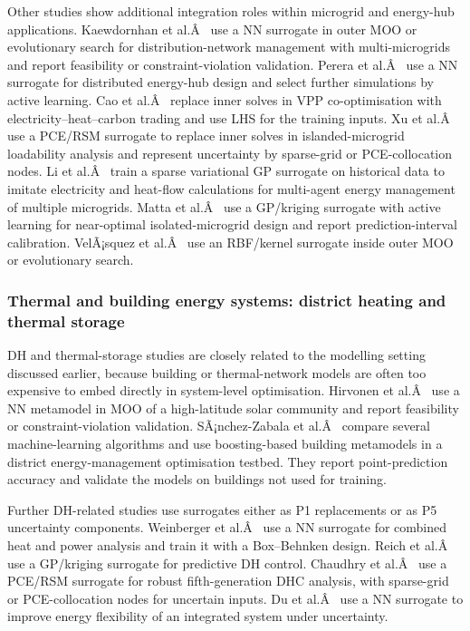 Other studies show additional integration roles within microgrid and
energy-hub applications. Kaewdornhan et al.Â~\cite{Kaewdornhan2022130373} use
a NN surrogate in outer MOO or evolutionary search for
distribution-network management with multi-microgrids and report
feasibility or constraint-violation validation. Perera et
al.Â~\cite{Perera2017187} use a NN surrogate for distributed energy-hub
design and select further simulations by active learning. Cao et
al.Â~\cite{Cao2023__2} replace inner solves in VPP co-optimisation with
electricity--heat--carbon trading and use LHS for the training inputs.
Xu et al.Â~\cite{Xu20184696} use a PCE/RSM surrogate to replace inner solves
in islanded-microgrid loadability analysis and represent uncertainty by
sparse-grid or PCE-collocation nodes. Li et al.Â~\cite{Li2023__3} train a
sparse variational GP surrogate on historical data to imitate
electricity and heat-flow calculations for multi-agent energy
management of multiple microgrids. Matta et
al.Â~\cite{Matta2026} use a GP/kriging surrogate with active learning for
near-optimal isolated-microgrid design and report prediction-interval
calibration. VelÃ¡squez et al.Â~\cite{velasquez_intelligence_2023} use an
RBF/kernel surrogate inside outer MOO or evolutionary search.

\subsubsection{Thermal and building energy systems: district heating and thermal storage}
\label{sec:apps:dh}

DH and thermal-storage studies are closely related to the modelling
setting discussed earlier, because building or thermal-network models
are often too expensive to embed directly in system-level optimisation.
Hirvonen et al.Â~\cite{Hirvonen2017323} use a NN metamodel in MOO of a
high-latitude solar community and report feasibility or
constraint-violation validation. SÃ¡nchez-Zabala et
al.Â~\cite{Sánchez-Zabala2024} compare several machine-learning algorithms
and use boosting-based building metamodels in a district
energy-management optimisation testbed. They report point-prediction
accuracy and validate the models on buildings not used for training.

Further DH-related studies use surrogates either as P1 replacements or
as P5 uncertainty components. Weinberger et al.Â~\cite{Weinberger2018555} use
a NN surrogate for combined heat and power analysis and train it with a
Box--Behnken design. Reich et al.Â~\cite{Reich2020} use a GP/kriging
surrogate for predictive DH control. Chaudhry et al.Â~\cite{Chaudhry2024} use
a PCE/RSM surrogate for robust fifth-generation DHC analysis, with
sparse-grid or PCE-collocation nodes for uncertain inputs. Du et
al.Â~\cite{Du2025} use a NN surrogate to improve energy flexibility of an
integrated system under uncertainty.

